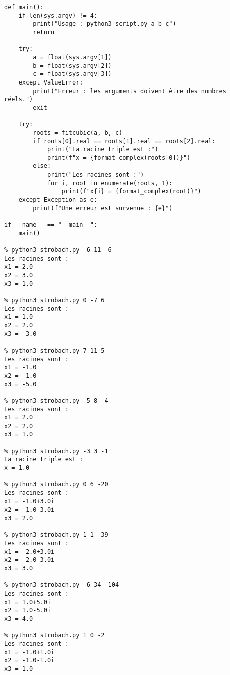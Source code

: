 \documentclass[11pt]{amsart}
\begin{document}
\begin{lstlisting}
def main():
    if len(sys.argv) != 4:
        print("Usage : python3 script.py a b c")
        return

    try:
        a = float(sys.argv[1])
        b = float(sys.argv[2])
        c = float(sys.argv[3])
    except ValueError:
        print("Erreur : les arguments doivent être des nombres réels.")
        exit

    try:
        roots = fitcubic(a, b, c)
        if roots[0].real == roots[1].real == roots[2].real:
            print("La racine triple est :")
            print(f"x = {format_complex(roots[0])}")
        else:
            print("Les racines sont :")
            for i, root in enumerate(roots, 1):
                print(f"x{i} = {format_complex(root)}")
    except Exception as e:
        print(f"Une erreur est survenue : {e}")

if __name__ == "__main__":
    main()

% python3 strobach.py -6 11 -6
Les racines sont :
x1 = 2.0
x2 = 3.0
x3 = 1.0

% python3 strobach.py 0 -7 6  
Les racines sont :
x1 = 1.0
x2 = 2.0
x3 = -3.0

% python3 strobach.py 7 11 5
Les racines sont :
x1 = -1.0
x2 = -1.0
x3 = -5.0

% python3 strobach.py -5 8 -4   
Les racines sont :
x1 = 2.0
x2 = 2.0
x3 = 1.0

% python3 strobach.py -3 3 -1
La racine triple est :
x = 1.0

% python3 strobach.py 0 6 -20
Les racines sont :
x1 = -1.0+3.0i
x2 = -1.0-3.0i
x3 = 2.0

% python3 strobach.py 1 1 -39
Les racines sont :
x1 = -2.0+3.0i
x2 = -2.0-3.0i
x3 = 3.0

% python3 strobach.py -6 34 -104
Les racines sont :
x1 = 1.0+5.0i
x2 = 1.0-5.0i
x3 = 4.0

% python3 strobach.py 1 0 -2    
Les racines sont :
x1 = -1.0+1.0i
x2 = -1.0-1.0i
x3 = 1.0
\end{lstlisting}
\end{document}
